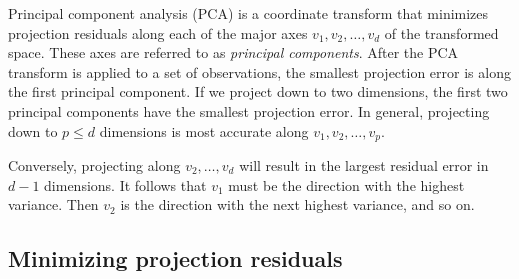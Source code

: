
Principal component analysis (PCA) is a coordinate transform that minimizes projection residuals along each of the major axes \(v_1, v_2, \dots, v_d\) of the transformed space.
These axes are referred to as \textit{principal components}.
After the PCA transform is applied to a set of observations, the smallest projection error is along the first principal component.
If we project down to two dimensions, the first two principal components have the smallest projection error.
In general, projecting down to \(p \leq d\) dimensions is most accurate along \(v_1, v_2, \dots, v_p\).

Conversely, projecting along \(v_2, \dots, v_d\) will result in the largest residual error in \(d-1\) dimensions.
It follows that \(v_1\) must be the direction with the highest variance.
Then \(v_2\) is the direction with the next highest variance, and so on.

\subsection{Minimizing projection residuals}





